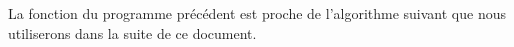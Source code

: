 	


\begin{remark}
	La fonction \emph{} du programme précédent est proche de l'algorithme suivant que nous utiliserons dans la suite de ce document.
\end{remark}

{\small
\begin{algo}[frame] \label{algo-square-ko}
    \Data{$\delta \in \NNs$}
	\BlankLine
\end{algo}
}

